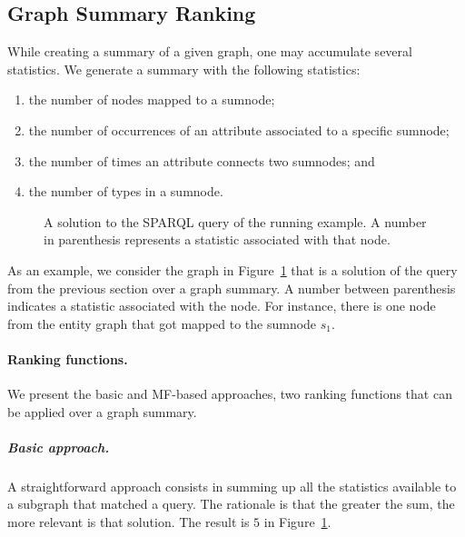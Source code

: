 \subsection{Graph Summary Ranking}

While creating a summary of a given graph, one may accumulate several statistics. We generate a summary with the following statistics:
\begin{enumerate}
	\item the number of nodes mapped to a sumnode;
	\item the number of occurrences of an attribute associated to a specific sumnode;
	\item the number of times an attribute connects two sumnodes; and
	\item the number of types in a sumnode.
\end{enumerate}

\begin{figure}
	\centering
	\resizebox{.6\textwidth}{!}{
		
	}
	\caption{A solution to the SPARQL query of the running example. A number in parenthesis represents a statistic associated with that node.}
	\label{fig:sparql-solution}
\end{figure}

As an example, we consider the graph in Figure~\ref{fig:sparql-solution} that is a solution of the query from the previous section over a graph summary. A number between parenthesis indicates a statistic associated with the node. For instance, there is one node from the entity graph that got mapped to the sumnode $s_1$.

\paragraph{Ranking functions.}

We present the basic and MF-based approaches, two ranking functions that can be applied over a graph summary.

\subparagraph{Basic approach.}

A straightforward approach consists in summing up all the statistics available to a subgraph that matched a query. The rationale is that the greater the sum, the more relevant is that solution. The result is $5$ in Figure~\ref{fig:sparql-solution}.



